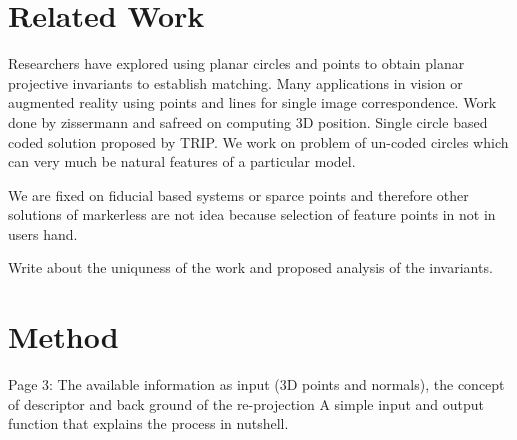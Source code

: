 \documentclass{bmvc2k}
\begin{document}



\section{Related Work}

Researchers have explored using planar circles and points to obtain planar projective invariants to establish matching. 
Many applications in vision or augmented reality using points and lines for single image correspondence. 
Work done by zissermann and safreed on computing 3D position. Single circle based coded solution proposed by TRIP. 
We work on problem of un-coded circles which can very much be natural features of a particular model.  

We are fixed on fiducial based systems or sparce points and therefore other solutions of markerless are not idea because selection of feature points in not in users hand.

Write about the uniquness of the work and proposed analysis of the invariants. 

\section{Method}
Page 3: 
The available information as input (3D points and normals), the concept of descriptor and back ground of the re-projection 
A simple input and output function that explains the process in nutshell. 
\end{document}
